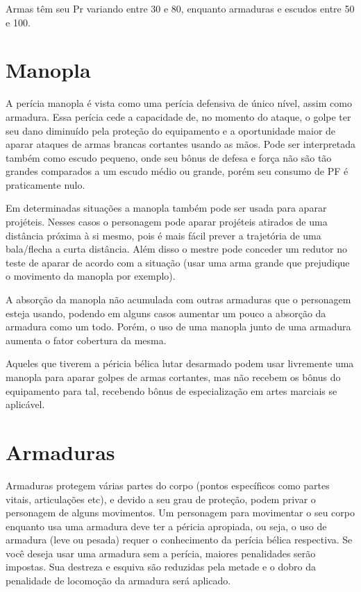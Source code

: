 Armas têm seu Pr variando entre 30 e 80, enquanto armaduras e escudos entre 50 e 100.

\section{Manopla}

A perícia manopla é vista como uma perícia defensiva de único nível, assim como armadura. Essa perícia cede a capacidade de, no momento do ataque, o golpe ter seu dano diminuído pela proteção do equipamento e a oportunidade maior de aparar ataques de armas brancas cortantes usando as mãos. Pode ser interpretada também como escudo pequeno, onde seu bônus de defesa e força não são tão grandes comparados a um escudo médio ou grande, porém seu consumo de PF é praticamente nulo. 

Em determinadas situações a manopla também pode ser usada para aparar projéteis. Nesses casos o personagem pode aparar projéteis atirados de uma distância próxima à si mesmo, pois é mais fácil prever a trajetória de uma bala/flecha a curta distância. Além disso o mestre pode conceder um redutor no teste de aparar de acordo com a situação (usar uma arma grande que prejudique o movimento da manopla por exemplo).

A absorção da manopla não acumulada com outras armaduras que o personagem esteja usando, podendo em alguns casos aumentar um pouco a absorção da armadura como um todo. Porém, o uso de uma manopla junto de uma armadura aumenta o fator cobertura da mesma.

Aqueles que tiverem a péricia bélica lutar desarmado podem usar livremente uma manopla para aparar golpes de armas cortantes, mas não recebem os bônus do equipamento para tal, recebendo bônus de especialização em artes marciais se aplicável.



\section{Armaduras}

Armaduras protegem várias partes do corpo (pontos específicos como partes vitais, articulações etc), e devido a seu grau de proteção, podem privar o personagem de alguns movimentos. Um personagem para movimentar o seu corpo enquanto usa uma armadura deve ter a péricia apropiada, ou seja, o uso de armadura (leve ou pesada) requer o conhecimento da perícia bélica respectiva. Se você deseja usar uma armadura sem a perícia, maiores penalidades serão impostas. Sua destreza e esquiva são reduzidas pela metade e o dobro da penalidade de locomoção da armadura será aplicado.
 
